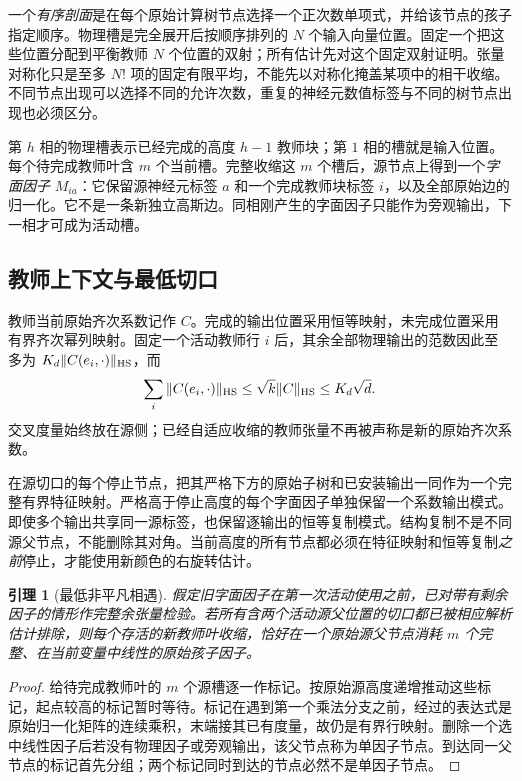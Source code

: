 \documentclass[a4paper]{tufte-handout}
\newtheorem{lemma}{引理}
\begin{document}
\begin{fullwidth}
一个\emph{有序剖面}是在每个原始计算树节点选择一个正次数单项式，并给该节点的孩子指定顺序。物理槽是完全展开后按顺序排列的 $N$ 个输入向量位置。固定一个把这些位置分配到平衡教师 $N$ 个位置的双射；所有估计先对这个固定双射证明。张量对称化只是至多 $N!$ 项的固定有限平均，不能先以对称化掩盖某项中的相干收缩。不同节点出现可以选择不同的允许次数，重复的神经元数值标签与不同的树节点出现也必须区分。

第 $h$ 相的物理槽表示已经完成的高度 $h-1$ 教师块；第 $1$ 相的槽就是输入位置。每个待完成教师叶含 $m$ 个当前槽。完整收缩这 $m$ 个槽后，源节点上得到一个\emph{字面因子} $M_{ia}$：它保留源神经元标签 $a$ 和一个完成教师块标签 $i$，以及全部原始边的归一化。它不是一条新独立高斯边。同相刚产生的字面因子只能作为旁观输出，下一相才可成为活动槽。

\subsection{教师上下文与最低切口}
教师当前原始齐次系数记作 $C$。完成的输出位置采用恒等映射，未完成位置采用有界齐次幂列映射。固定一个活动教师行 $i$ 后，其余全部物理输出的范数因此至多为 $K_d\|C(e_i,\cdot)\|_{\rm HS}$，而
\begin{equation}\label{fp:teacher-slices}
 \sum_i\|C(e_i,\cdot)\|_{\rm HS}
 \le \sqrt{k}\|C\|_{\rm HS}\le K_d\sqrt d.
\end{equation}
交叉度量始终放在源侧；已经自适应收缩的教师张量不再被声称是新的原始齐次系数。

在源切口的每个停止节点，把其严格下方的原始子树和已安装输出一同作为一个完整有界特征映射。严格高于停止高度的每个字面因子单独保留一个系数输出模式。即使多个输出共享同一源标签，也保留逐输出的恒等复制模式。结构复制不是不同源父节点，不能删除其对角。当前高度的所有节点都必须在特征映射和恒等复制\emph{之前}停止，才能使用新颜色的右旋转估计。

\begin{lemma}[最低非平凡相遇]\label{fp:lowest-cut}
假定旧字面因子在第一次活动使用之前，已对带有剩余因子的情形作完整余张量检验。若所有含两个活动源父位置的切口都已被相应解析估计排除，则每个存活的新教师叶收缩，恰好在一个原始源父节点消耗 $m$ 个完整、在当前变量中线性的原始孩子因子。
\end{lemma}
\begin{proof}
给待完成教师叶的 $m$ 个源槽逐一作标记。按原始源高度递增推动这些标记，起点较高的标记暂时等待。标记在遇到第一个乘法分支之前，经过的表达式是原始归一化矩阵的连续乘积，末端接其已有度量，故仍是有界行映射。删除一个选中线性因子后若没有物理因子或旁观输出，该父节点称为单因子节点。到达同一父节点的标记首先分组；两个标记同时到达的节点必然不是单因子节点。


\end{proof}
\end{fullwidth}
\end{document}
